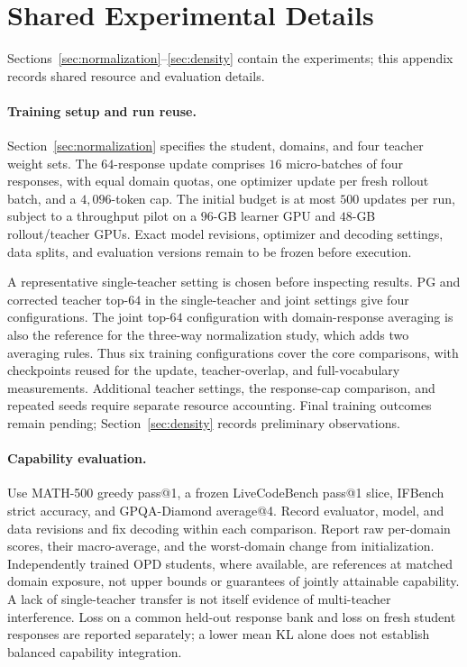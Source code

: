\section{Shared Experimental Details}
\label{app:setup}

Sections~\ref{sec:normalization}--\ref{sec:density} contain the experiments;
this appendix records shared resource and evaluation details.

\paragraph{Training setup and run reuse.}
Section~\ref{sec:normalization} specifies the student, domains, and four
teacher weight sets. The $64$-response update comprises $16$ micro-batches
of four responses, with equal domain quotas, one optimizer update per
fresh rollout batch, and a $4{,}096$-token cap.
The initial budget is at most $500$ updates per run, subject to a
throughput pilot on a $96$-GB learner GPU and $48$-GB rollout/teacher GPUs.
Exact model revisions, optimizer and decoding settings, data splits,
and evaluation versions remain to be frozen before execution.

A representative single-teacher setting is chosen before inspecting
results. PG and corrected teacher top-$64$ in the single-teacher and
joint settings give four configurations. The joint top-$64$ configuration
with domain-response averaging is also the reference for the three-way
normalization study, which adds two averaging rules. Thus six training
configurations cover the core comparisons, with checkpoints reused for
the update, teacher-overlap, and full-vocabulary measurements.
Additional teacher settings, the response-cap comparison, and repeated
seeds require separate resource accounting. Final training outcomes remain
pending; Section~\ref{sec:density} records preliminary observations.

\paragraph{Capability evaluation.}
Use MATH-500 greedy pass@1, a frozen LiveCodeBench pass@1 slice,
IFBench strict accuracy, and GPQA-Diamond average@4. Record evaluator,
model, and data revisions and fix decoding within each comparison.
Report raw per-domain scores, their macro-average, and the worst-domain
change from initialization. Independently trained OPD students, where
available, are references at matched domain exposure, not upper bounds
or guarantees of jointly attainable capability. A lack of single-teacher
transfer is not itself evidence of multi-teacher interference.
Loss on a common held-out response bank and loss on fresh student
responses are reported separately; a lower mean KL alone does not
establish balanced capability integration.

